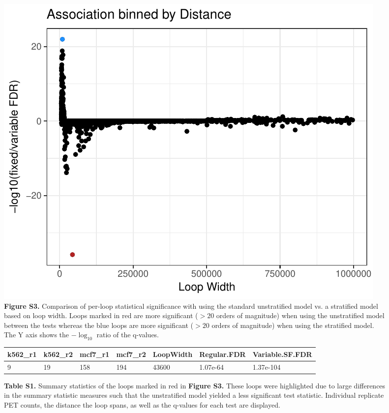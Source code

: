 \documentclass{article}\usepackage[]{graphicx}\usepackage[]{color}
\makeatletter
\def\maxwidth{ %
  \ifdim\Gin@nat@width>\linewidth
    \linewidth
  \else
    \Gin@nat@width
  \fi
}
\newenvironment{knitrout}{}{} %
\makeatother
\begin{document}
\begin{figure}[h]
\begin{knitrout}
\color{fgcolor}

{\centering \includegraphics[width=\maxwidth]{figure/other-1} 

}



\end{knitrout}
\centering
\caption{\textbf{Figure S3.} Comparison of per-loop statistical significance with using the standard unstratified model vs. a stratified model based on loop width. Loops marked in red are more significant ($> 20$ orders of magnitude) when using the unstratified model between the tests whereas the blue loops are more significant ($>20$ orders of magnitude) when using the stratified model. The Y axis shows the $-\log_{10}$ ratio of the q-values. \newline}
\end{figure} \newpage \newpage 

\begin{figure}[h]
\begin{knitrout}
\color{fgcolor}
\begin{tabular}{l|l|l|l|l|l|l}
\hline
k562\_r1 & k562\_r2 & mcf7\_r1 & mcf7\_r2 & LoopWidth & Regular.FDR & Variable.SF.FDR\\
\hline
9 & 19 & 158 & 194 & 43600 & 1.07e-64 & 1.37e-104\\
\hline
\end{tabular}


\end{knitrout}
\centering
\caption{\textbf{Table S1.} Summary statistics of the loops marked in red in \textbf{Figure S3.} These loops were highlighted due to large differences in the summary statistic measures such that the unstratified model yielded a less significant test statistic. Individual replicate PET counts, the distance the loop spans, as well as the q-values for each test are displayed. \newline } 
\end{figure}
\end{document}
